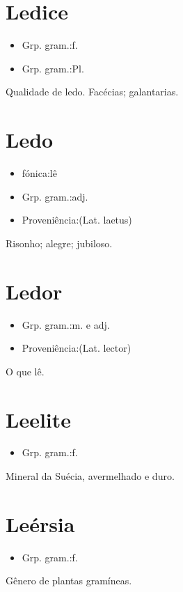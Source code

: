 \section{Ledice}
\begin{itemize}
\item {Grp. gram.:f.}
\end{itemize}
\begin{itemize}
\item {Grp. gram.:Pl.}
\end{itemize}
Qualidade de ledo.
Facécias; galantarias.
\section{Ledo}
\begin{itemize}
\item {fónica:lê}
\end{itemize}
\begin{itemize}
\item {Grp. gram.:adj.}
\end{itemize}
\begin{itemize}
\item {Proveniência:(Lat. \textunderscore laetus\textunderscore )}
\end{itemize}
Risonho; alegre; jubiloso.
\section{Ledor}
\begin{itemize}
\item {Grp. gram.:m.  e  adj.}
\end{itemize}
\begin{itemize}
\item {Proveniência:(Lat. \textunderscore lector\textunderscore )}
\end{itemize}
O que lê.
\section{Leelite}
\begin{itemize}
\item {Grp. gram.:f.}
\end{itemize}
Mineral da Suécia, avermelhado e duro.
\section{Leérsia}
\begin{itemize}
\item {Grp. gram.:f.}
\end{itemize}
Gênero de plantas gramíneas.
